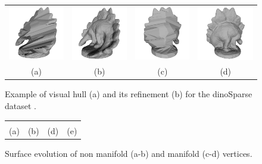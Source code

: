 \begin{figure}[t]
\centering
 \begin{tabular}{cccc}
  \includegraphics[width=0.2\columnwidth]{./img/ch_soa/dinoHull01}&
  \includegraphics[width=0.2\columnwidth]{./img/ch_soa/dinoRef01}&
  \includegraphics[width=0.2\columnwidth]{./img/ch_soa/dinoHull02}&
  \includegraphics[width=0.2\columnwidth]{./img/ch_soa/dinoRef02}\\
  (a)&(b)&(c)&(d)
 \end{tabular}
 \caption{Example of visual hull (a) and its refinement (b) for the dinoSparse dataset \cite{seitz_et_al06}.}
 \label{fig:visualhullex}
\end{figure}



\begin{figure}[tb]
\centering
\setlength{\tabcolsep}{1px}
\begin{tabular}{cccc}
{\def\svgwidth{0.23\textwidth}
  }&
{\def\svgwidth{0.23\textwidth}
  }&
{\def\svgwidth{0.23\textwidth}
  }&
{\def\svgwidth{0.23\textwidth}
  }\\
(a)&(b)&(d)&(e)\\
\end{tabular}
\label{fig:whymanifold}
\caption{Surface evolution of non manifold (a-b) and manifold (c-d) vertices.}
\end{figure}

